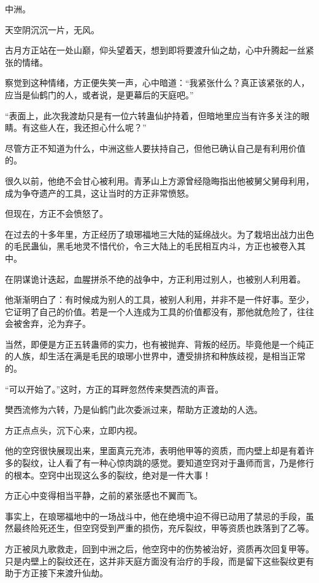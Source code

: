 
\begin{this_body}

中洲。

天空阴沉沉一片，无风。

古月方正站在一处山巅，仰头望着天，想到即将要渡升仙之劫，心中升腾起一丝紧张的情绪。

察觉到这种情绪，方正便失笑一声，心中暗道：“我紧张什么？真正该紧张的人，应当是仙鹤门的人，或者说，是更幕后的天庭吧。”

“表面上，此次我渡劫只是有一位六转蛊仙护持着，但暗地里应当有许多关注的眼睛。有这些人在，我还担心什么呢？”

尽管方正不知道为什么，中洲这些人要扶持自己，但他已确认自己是有利用价值的。

很久以前，他绝不会甘心被利用。青茅山上方源曾经隐晦指出他被舅父舅母利用，成为争夺遗产的工具，这让当时的方正非常愤怒。

但现在，方正不会愤怒了。

在过去的十多年里，方正经历了琅琊福地三大陆的延绵战火。为了栽培出战力出色的毛民蛊仙，黑毛地灵不惜代价，令三大陆上的毛民相互内斗，方正也被卷入其中。

在阴谋诡计迭起，血腥拼杀不绝的战争中，方正利用过别人，也被别人利用着。

他渐渐明白了：有时候成为别人的工具，被别人利用，并非不是一件好事。至少，它证明了自己的价值。若是一个人连成为工具的价值都没有，那他就危险了，往往会被舍弃，沦为弃子。

当然，即便是方正五转蛊师的实力，也有被抛弃、背叛的经历。毕竟他是一个纯正的人族，却生活在满是毛民的琅琊小世界中，遭受排挤和种族歧视，是相当正常的。

“可以开始了。”这时，方正的耳畔忽然传来樊西流的声音。

樊西流修为六转，乃是仙鹤门此次委派过来，帮助方正渡劫的人选。

方正点点头，沉下心来，立即内视。

他的空窍很快展现出来，里面真元充沛，表明他甲等的资质，而内壁上却是有着许多的裂纹，让人看了有一种心惊肉跳的感觉。要知道空窍对于蛊师而言，乃是修行的根本。空窍中出现这么多的裂纹，绝对是一件大事！

方正心中变得相当平静，之前的紧张感也不翼而飞。

事实上，在琅琊福地中的一场战斗中，他在绝境中迫不得已动用了禁忌的手段，虽然最终险死还生，但空窍受到严重的损伤，充斥裂纹，甲等资质也跌落到了乙等。

方正被凤九歌救走，回到中洲之后，他空窍中的伤势被治好，资质再次回复甲等。只是内壁上的裂纹还在，这并非天庭方面没有治疗的手段，而是留下这些裂纹更有助于方正接下来渡升仙劫。


\end{this_body}
